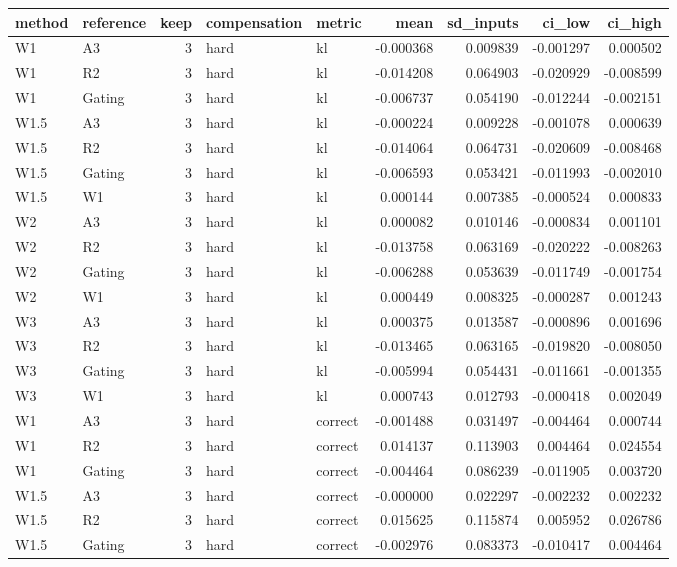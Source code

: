 \begin{tabular}{llrllrrrr}
\toprule
method & reference & keep & compensation & metric & mean & sd_inputs & ci_low & ci_high \\
\midrule
W1 & A3 & 3 & hard & kl & -0.000368 & 0.009839 & -0.001297 & 0.000502 \\
W1 & R2 & 3 & hard & kl & -0.014208 & 0.064903 & -0.020929 & -0.008599 \\
W1 & Gating & 3 & hard & kl & -0.006737 & 0.054190 & -0.012244 & -0.002151 \\
W1.5 & A3 & 3 & hard & kl & -0.000224 & 0.009228 & -0.001078 & 0.000639 \\
W1.5 & R2 & 3 & hard & kl & -0.014064 & 0.064731 & -0.020609 & -0.008468 \\
W1.5 & Gating & 3 & hard & kl & -0.006593 & 0.053421 & -0.011993 & -0.002010 \\
W1.5 & W1 & 3 & hard & kl & 0.000144 & 0.007385 & -0.000524 & 0.000833 \\
W2 & A3 & 3 & hard & kl & 0.000082 & 0.010146 & -0.000834 & 0.001101 \\
W2 & R2 & 3 & hard & kl & -0.013758 & 0.063169 & -0.020222 & -0.008263 \\
W2 & Gating & 3 & hard & kl & -0.006288 & 0.053639 & -0.011749 & -0.001754 \\
W2 & W1 & 3 & hard & kl & 0.000449 & 0.008325 & -0.000287 & 0.001243 \\
W3 & A3 & 3 & hard & kl & 0.000375 & 0.013587 & -0.000896 & 0.001696 \\
W3 & R2 & 3 & hard & kl & -0.013465 & 0.063165 & -0.019820 & -0.008050 \\
W3 & Gating & 3 & hard & kl & -0.005994 & 0.054431 & -0.011661 & -0.001355 \\
W3 & W1 & 3 & hard & kl & 0.000743 & 0.012793 & -0.000418 & 0.002049 \\
W1 & A3 & 3 & hard & correct & -0.001488 & 0.031497 & -0.004464 & 0.000744 \\
W1 & R2 & 3 & hard & correct & 0.014137 & 0.113903 & 0.004464 & 0.024554 \\
W1 & Gating & 3 & hard & correct & -0.004464 & 0.086239 & -0.011905 & 0.003720 \\
W1.5 & A3 & 3 & hard & correct & -0.000000 & 0.022297 & -0.002232 & 0.002232 \\
W1.5 & R2 & 3 & hard & correct & 0.015625 & 0.115874 & 0.005952 & 0.026786 \\
W1.5 & Gating & 3 & hard & correct & -0.002976 & 0.083373 & -0.010417 & 0.004464 \\

\end{tabular}

